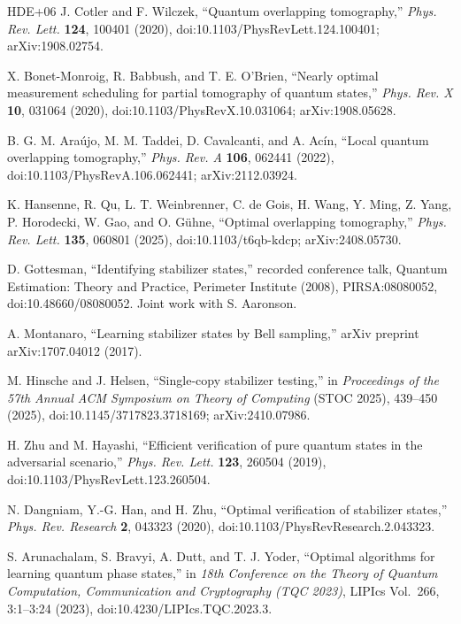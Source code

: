 \documentclass[11pt]{article}
\newcommand{\1}{\mathbf 1}
\theoremstyle{plain}
\theoremstyle{definition}
\theoremstyle{remark}
\begin{document}
\begin{thebibliography}{HDE+06}
J. Cotler and F. Wilczek, ``Quantum overlapping tomography,''
\emph{Phys. Rev. Lett.} \textbf{124}, 100401 (2020),
doi:10.1103/PhysRevLett.124.100401; arXiv:1908.02754.

X. Bonet-Monroig, R. Babbush, and T. E. O'Brien,
``Nearly optimal measurement scheduling for partial tomography of quantum
states,'' \emph{Phys. Rev. X} \textbf{10}, 031064 (2020),
doi:10.1103/PhysRevX.10.031064; arXiv:1908.05628.

B. G. M. Ara\'{u}jo, M. M. Taddei, D. Cavalcanti, and A. Ac\'{i}n,
``Local quantum overlapping tomography,''
\emph{Phys. Rev. A} \textbf{106}, 062441 (2022),
doi:10.1103/PhysRevA.106.062441; arXiv:2112.03924.

K. Hansenne, R. Qu, L. T. Weinbrenner, C. de Gois, H. Wang, Y. Ming,
Z. Yang, P. Horodecki, W. Gao, and O. G\"{u}hne,
``Optimal overlapping tomography,''
\emph{Phys. Rev. Lett.} \textbf{135}, 060801 (2025),
doi:10.1103/t6qb-kdcp; arXiv:2408.05730.

D. Gottesman, ``Identifying stabilizer states,'' recorded conference talk,
Quantum Estimation: Theory and Practice, Perimeter Institute (2008),
PIRSA:08080052, doi:10.48660/08080052.  Joint work with S. Aaronson.

A. Montanaro, ``Learning stabilizer states by Bell sampling,''
arXiv preprint arXiv:1707.04012 (2017).

M. Hinsche and J. Helsen, ``Single-copy stabilizer testing,''
in \emph{Proceedings of the 57th Annual ACM Symposium on Theory of Computing}
(STOC 2025), 439--450 (2025), doi:10.1145/3717823.3718169;
arXiv:2410.07986.

H. Zhu and M. Hayashi, ``Efficient verification of pure quantum states in the
adversarial scenario,'' \emph{Phys. Rev. Lett.} \textbf{123}, 260504
(2019), doi:10.1103/PhysRevLett.123.260504.

N. Dangniam, Y.-G. Han, and H. Zhu, ``Optimal verification of stabilizer
states,'' \emph{Phys. Rev. Research} \textbf{2}, 043323 (2020),
doi:10.1103/PhysRevResearch.2.043323.

S. Arunachalam, S. Bravyi, A. Dutt, and T. J. Yoder,
``Optimal algorithms for learning quantum phase states,''
in \emph{18th Conference on the Theory of Quantum Computation,
Communication and Cryptography (TQC 2023)}, LIPIcs Vol.~266,
3:1--3:24 (2023), doi:10.4230/LIPIcs.TQC.2023.3.


\end{thebibliography}
\end{document}
